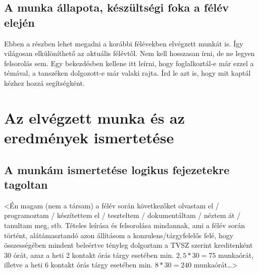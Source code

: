 \documentclass[a4paper,oneside]{article}
\begin{document}



\subsection{A munka állapota, készültségi foka a félév elején}
\label{sec:munka-allap-kesz}

Ebben a részben lehet megadni a korábbi félévekben elvégzett munkát
is.  Így világosan elkülöníthető az aktuális félévtől.  Nem kell
hosszasan írni, de ne legyen felsorolás sem.  Egy bekezdésben kellene
itt leírni, hogy foglalkoztál-e már ezzel a témával, a tanszéken
dolgozott-e már valaki rajta.  Írd le azt is, hogy mit kaptál kézhez
hozzá segítségként.

\newpage
\section{Az elvégzett munka és az eredmények ismertetése}
\label{sec:az-elvegzett-munka}


\subsection{A munkám ismertetése logikus fejezetekre tagoltan}
\label{sec:a-munkam-ismert}
<Én magam (nem a társam) a félév során következőket olvastam el /
programoztam / készítettem el / teszteltem / dokumentáltam / néztem át
/ tanultam meg, stb.  Tételes leírása és felsorolása mindannak, ami a
félév során történt, alátámasztandó azon állításom a
konzulens/tárgyfelelős felé, hogy összességében mindent beleértve
tényleg dolgoztam a TVSZ szerint kreditenként 30 órát, azaz a heti 2
kontakt órás tárgy esetében min. $2,5*30 = 75$ munkaórát, illetve a
heti 6 kontakt órás tárgy esetében min. $8*30 = 240$ munkaórát\dots>
\end{document}
